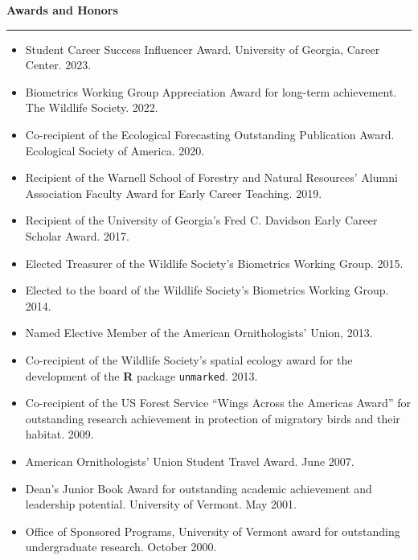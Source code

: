 \documentclass[12pt]{article}
\begin{document}
\vspace{0.5cm}

\newpage %


{\large \bf Awards and Honors} \\
\rule[3mm]{\textwidth}{0.3mm}

\begin{itemize}

\item Student Career Success Influencer Award. University of
  Georgia, Career Center. 2023.

\item Biometrics Working Group Appreciation Award for long-term
  achievement. The Wildlife Society. 2022.
  
\item Co-recipient of the Ecological Forecasting Outstanding
  Publication Award. Ecological Society of America. 2020. 
  
\item Recipient of the Warnell School of Forestry and Natural
  Resources' Alumni Association Faculty Award for Early Career
  Teaching. 2019. 
  
\item Recipient of the University of Georgia's Fred C. Davidson Early
  Career Scholar Award. 2017. 

\item Elected Treasurer of the Wildlife Society's Biometrics Working
  Group. 2015. 

\item Elected to the board of the Wildlife Society's Biometrics
  Working Group. 2014. 

\item Named Elective Member of the American Ornithologists' Union,
  2013. 

\item Co-recipient of the Wildlife Society's spatial ecology award for
  the development of the {\bf R} package {\tt unmarked}. 2013.

\item Co-recipient of the US Forest Service ``Wings Across the
  Americas Award'' for outstanding research achievement in protection
  of migratory birds and their habitat. 2009.

\item American Ornithologists' Union Student Travel Award. June 2007.

\item Dean's Junior Book Award for outstanding academic achievement
  and leadership potential. University of Vermont. May 2001.

\item Office of Sponsored Programs, University of Vermont award for
  outstanding undergraduate research. October 2000.

\end{itemize}
\end{document}
